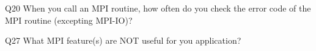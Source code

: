 \begin{description}%
\item{Q20} When you call an MPI routine, how often do you check the error code of the MPI routine  (excepting MPI-IO)?%
\item{Q27} What MPI feature(s) are NOT useful for you application?%
\end{description}%
